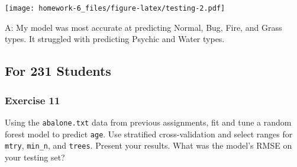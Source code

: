 \documentclass[
]{article}
\begin{document}
\texttt{[image: homework-6\_files/figure-latex/testing-2.pdf]}

A: My model was most accurate at predicting Normal, Bug, Fire, and Grass
types. It struggled with predicting Psychic and Water types.

\hypertarget{for-231-students}{%
\subsection{For 231 Students}\label{for-231-students}}

\hypertarget{exercise-11}{%
\subsubsection{Exercise 11}\label{exercise-11}}

Using the \texttt{abalone.txt} data from previous assignments, fit and
tune a random forest model to predict \texttt{age}. Use stratified
cross-validation and select ranges for \texttt{mtry}, \texttt{min\_n},
and \texttt{trees}. Present your results. What was the model's RMSE on
your testing set?
\end{document}
